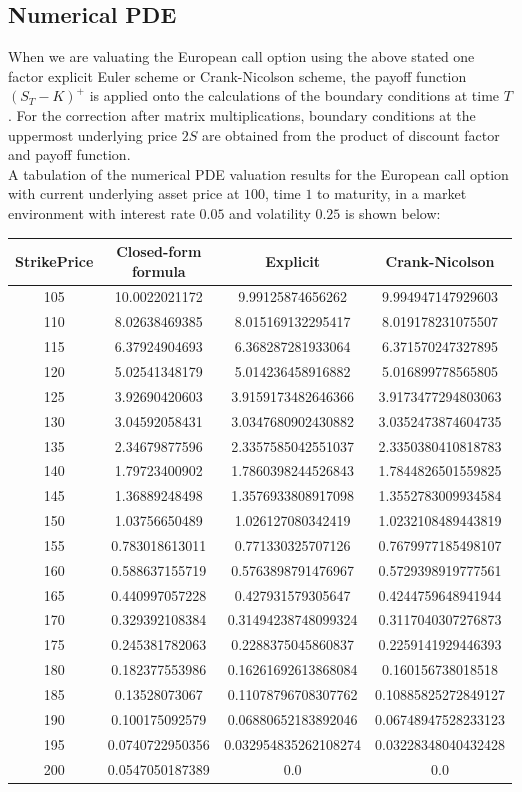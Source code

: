 \subsection{Numerical PDE}
When we are valuating the European call option using the above stated one factor explicit Euler scheme or Crank-Nicolson scheme, the payoff function $(S_{T} - K)^{+}$ is applied onto the calculations of the boundary conditions at time $T$. For the correction after matrix multiplications, boundary conditions at the uppermost underlying price $2S$ are obtained from the product of discount factor and payoff function.\\[1mm]
A tabulation of the numerical PDE valuation results for the European call option with current underlying asset price at $100$, time $1$ to maturity, in a market environment with interest rate $0.05$ and volatility $0.25$ is shown below:
\begin{center}
\begin{tabular}{|c|c|c|c|}
\hline
StrikePrice & Closed-form formula & Explicit & Crank-Nicolson\\
\hline
105 & 10.0022021172&   9.99125874656262 &     9.994947147929603 \\
110 & 8.02638469385&   8.015169132295417 &    8.019178231075507 \\
115 & 6.37924904693&   6.368287281933064 &    6.371570247327895 \\
120 & 5.02541348179&   5.014236458916882 &    5.016899778565805 \\
125 & 3.92690420603&   3.9159173482646366 &   3.9173477294803063 \\
130 & 3.04592058431&   3.0347680902430882 &   3.0352473874604735 \\
135 & 2.34679877596&   2.3357585042551037 &   2.3350380410818783 \\
140 & 1.79723400902&   1.7860398244526843 &   1.7844826501559825 \\
145 & 1.36889248498&   1.3576933808917098 &   1.3552783009934584 \\
150 & 1.03756650489&   1.026127080342419 &    1.0232108489443819 \\
155 & 0.783018613011&  0.771330325707126 &    0.7679977185498107 \\
160 & 0.588637155719&  0.5763898791476967 &   0.5729398919777561 \\
165 & 0.440997057228&  0.427931579305647 &    0.4244759648941944 \\
170 & 0.329392108384&  0.31494238748099324 &  0.3117040307276873 \\
175 & 0.245381782063&  0.2288375045860837 &   0.2259141929446393 \\
180 & 0.182377553986&  0.16261692613868084 &  0.160156738018518 \\
185 & 0.13528073067&   0.11078796708307762 &  0.10885825272849127 \\
190 & 0.100175092579&  0.06880652183892046 &  0.06748947528233123 \\
195 & 0.0740722950356& 0.032954835262108274 & 0.03228348040432428 \\
200 & 0.0547050187389& 0.0 &                  0.0 \\
\hline
\end{tabular}
\end{center}
